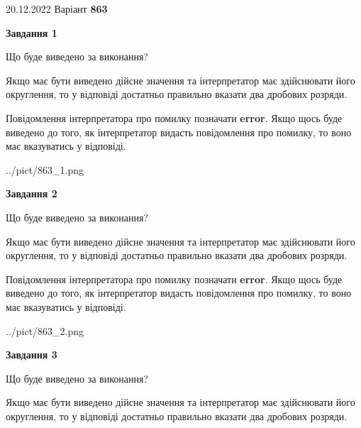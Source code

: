 \documentclass[12pt, ukrainian]{article}
\begin{document}
{20.12.2022 Варіант \No \textbf { 863 }\par}
{
\begin {Large}

{\begin {center}\textbf{Завдання 1}\end {center}}\par
Що буде виведено за виконання? \par

Якщо має бути виведено дійсне значення та інтерпретатор має здійснювати його округлення, 
то у відповіді достатньо правильно вказати два дробових розряди.

Повідомлення інтерпретатора про помилку позначати \textbf{error}.
Якщо щось буде виведено до того, як інтерпретатор видасть повідомлення про помилку, 
то воно має вказуватись у відповіді. \par

\begin{center}
	{../pict/863_1.png}
\end{center}
\newpage

{\begin {center}\textbf{Завдання 2}\end {center}}\par
Що буде виведено за виконання? \par

Якщо має бути виведено дійсне значення та інтерпретатор має здійснювати його округлення, 
то у відповіді достатньо правильно вказати два дробових розряди.

Повідомлення інтерпретатора про помилку позначати \textbf{error}.
Якщо щось буде виведено до того, як інтерпретатор видасть повідомлення про помилку, 
то воно має вказуватись у відповіді. \par

\begin{center}
	{../pict/863_2.png}
\end{center}
\newpage

{\begin {center}\textbf{Завдання 3}\end {center}}\par
Що буде виведено за виконання? \par

Якщо має бути виведено дійсне значення та інтерпретатор має здійснювати його округлення, 
то у відповіді достатньо правильно вказати два дробових розряди.


\end{Large}}
\end{document}
